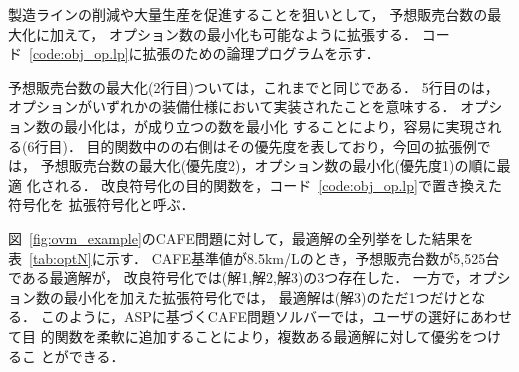 製造ラインの削減や大量生産を促進することを狙いとして，
予想販売台数の最大化に加えて，
オプション数の最小化も可能なように拡張する．
コード~\ref{code:obj_op.lp}に拡張のための論理プログラムを示す．

予想販売台数の最大化(2行目)ついては，これまでと同じである．
5行目のは，
オプションがいずれかの装備仕様において実装されたことを意味する．
オプション数の最小化は，が成り立つの数を最小化
することにより，容易に実現される(6行目)．
目的関数中のの右側はその優先度を表しており，今回の拡張例では，
予想販売台数の最大化(優先度2)，オプション数の最小化(優先度1)の順に最適
化される．
改良符号化の目的関数を，コード~\ref{code:obj_op.lp}で置き換えた符号化を
拡張符号化と呼ぶ．

図~\ref{fig:ovm_example}のCAFE問題に対して，最適解の全列挙をした結果を
表~\ref{tab:optN}に示す．
CAFE基準値が8.5km/Lのとき，予想販売台数が5,525台である最適解が，
改良符号化では(解1,解2,解3)の3つ存在した．
一方で，オプション数の最小化を加えた拡張符号化では，
最適解は(解3)のただ1つだけとなる．
このように，ASPに基づくCAFE問題ソルバーでは，ユーザの選好にあわせて目
的関数を柔軟に追加することにより，複数ある最適解に対して優劣をつけるこ
とができる．


